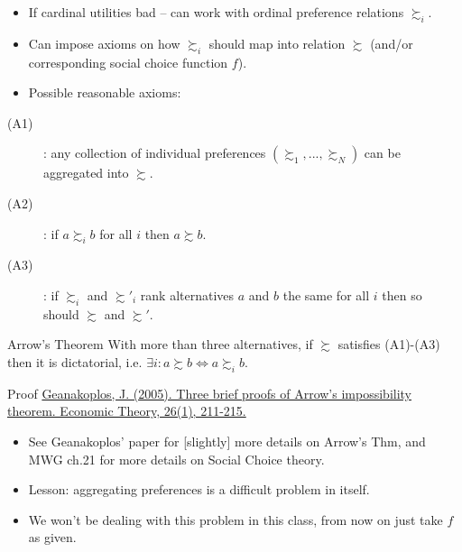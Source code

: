 \documentclass[english,handout,10pt]{beamer}		%
\def\lyxframeend{} %
\begin{document}
\begin{itemize}
	\item If cardinal utilities bad -- can work with ordinal preference relations $\succsim_i$.
	\item Can impose axioms on how  $\succsim_i$ should map into  relation $\succsim$ (and/or corresponding social choice function $f$).
	\pause
	\item Possible reasonable axioms:
\end{itemize}
\begin{description}
	\item[(A1)] : any collection of individual preferences $\left(\succsim_1, ..., \succsim_N \right)$ can be aggregated into $\succsim$.
	\item[(A2)] : if $a \succsim_i b$ for all $i$ then $a \succsim b$.
	\item[(A3)] : if $\succsim_i$ and $\succsim'_i$ rank alternatives $a$ and $b$ the same for all $i$ then so should $\succsim$ and $\succsim'$.
\end{description}
\lyxframeend


\begin{block}{Arrow's Theorem}
	With more than three alternatives, if $\succsim$ satisfies (A1)-(A3) then it is dictatorial, i.e. $\exists i: a \succsim b \Leftrightarrow a \succsim_i b$.
\end{block}
\begin{block}{Proof}
	\pause \href{https://link.springer.com/article/10.1007/s00199-004-0556-7}{Geanakoplos, J. (2005). Three brief proofs of Arrow's impossibility theorem. Economic Theory, 26(1), 211-215.}
	\vspace{8em}
\end{block}
\lyxframeend


\begin{itemize}
	\item See Geanakoplos' paper for [slightly] more details on Arrow's Thm, and MWG ch.21 for more details on Social Choice theory.
	\item Lesson: aggregating preferences is a difficult problem in itself.
	\item We won't be dealing with this problem in this class, from now on just take $f$ as given.
\end{itemize}
\lyxframeend
\end{document}
